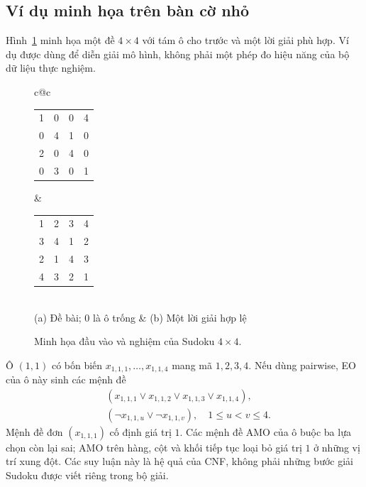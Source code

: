 \documentclass[a4paper,fleqn]{cas-sc}
\begin{document}
\subsection{Ví dụ minh họa trên bàn cờ nhỏ}

Hình~\ref{fig:method-example} minh họa một đề $4\times4$ với tám ô
cho trước và một lời giải phù hợp. Ví dụ được dùng để diễn giải mô hình,
không phải một phép đo hiệu năng của bộ dữ liệu thực nghiệm.

\begin{figure}[pos=htbp]
 \centering
 \begingroup
 \setlength{\tabcolsep}{9pt}
 \renewcommand{\arraystretch}{1.3}
 \begin{tabular}{c@{\hspace{1.4cm}}c}
  \begin{tabular}{|cc|cc|}
   \hline
   1 & 0 & 0 & 4 \\
   0 & 4 & 1 & 0 \\ \hline
   2 & 0 & 4 & 0 \\
   0 & 3 & 0 & 1 \\ \hline
  \end{tabular}
  &
  \begin{tabular}{|cc|cc|}
   \hline
   1 & 2 & 3 & 4 \\
   3 & 4 & 1 & 2 \\ \hline
   2 & 1 & 4 & 3 \\
   4 & 3 & 2 & 1 \\ \hline
  \end{tabular}\\[5pt]
  (a) Đề bài; $0$ là ô trống & (b) Một lời giải hợp lệ
 \end{tabular}
 \endgroup
 \caption{Minh họa đầu vào và nghiệm của Sudoku $4\times4$.}
 \label{fig:method-example}
\end{figure}

Ô $(1,1)$ có bốn biến $x_{1,1,1},\ldots,x_{1,1,4}$ mang mã $1,2,3,4$.
Nếu dùng pairwise, EO của ô này sinh các mệnh đề
\begin{align}
 &(x_{1,1,1}\lor x_{1,1,2}\lor x_{1,1,3}\lor x_{1,1,4}),\nonumber\\
 &(\neg x_{1,1,u}\lor\neg x_{1,1,v}),
 \quad 1\leq u<v\leq4.
 \label{eq:method-example-cell}
\end{align}
Mệnh đề đơn $(x_{1,1,1})$ cố định giá trị $1$. Các mệnh đề AMO của ô
buộc ba lựa chọn còn lại sai; AMO trên hàng, cột và khối tiếp tục loại
bỏ giá trị $1$ ở những vị trí xung đột. Các suy luận này là hệ quả của
CNF, không phải những bước giải Sudoku được viết riêng trong bộ giải.
\end{document}
